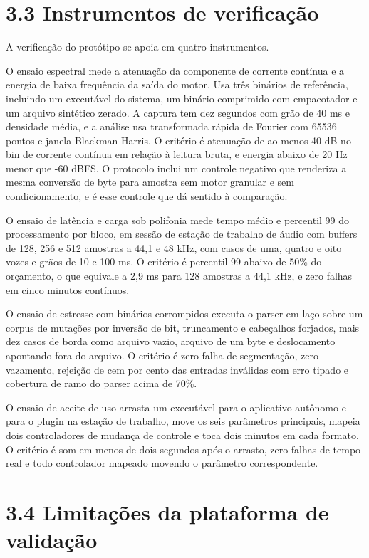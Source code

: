 \documentclass[12pt,a4paper]{article}
\begin{document}
\section*{3.3 Instrumentos de verificação}

A verificação do protótipo se apoia em quatro instrumentos.


O ensaio espectral mede a atenuação da componente de corrente contínua e a energia de baixa frequência da saída do motor. Usa três binários de referência, incluindo um executável do sistema, um binário comprimido com empacotador e um arquivo sintético zerado. A captura tem dez segundos com grão de 40 ms e densidade média, e a análise usa transformada rápida de Fourier com 65536 pontos e janela Blackman-Harris. O critério é atenuação de ao menos 40 dB no bin de corrente contínua em relação à leitura bruta, e energia abaixo de 20 Hz menor que -60 dBFS. O protocolo inclui um controle negativo que renderiza a mesma conversão de byte para amostra sem motor granular e sem condicionamento, e é esse controle que dá sentido à comparação.


O ensaio de latência e carga sob polifonia mede tempo médio e percentil 99 do processamento por bloco, em sessão de estação de trabalho de áudio com buffers de 128, 256 e 512 amostras a 44,1 e 48 kHz, com casos de uma, quatro e oito vozes e grãos de 10 e 100 ms. O critério é percentil 99 abaixo de 50\% do orçamento, o que equivale a 2,9 ms para 128 amostras a 44,1 kHz, e zero falhas em cinco minutos contínuos.


O ensaio de estresse com binários corrompidos executa o parser em laço sobre um corpus de mutações por inversão de bit, truncamento e cabeçalhos forjados, mais dez casos de borda como arquivo vazio, arquivo de um byte e deslocamento apontando fora do arquivo. O critério é zero falha de segmentação, zero vazamento, rejeição de cem por cento das entradas inválidas com erro tipado e cobertura de ramo do parser acima de 70\%.


O ensaio de aceite de uso arrasta um executável para o aplicativo autônomo e para o plugin na estação de trabalho, move os seis parâmetros principais, mapeia dois controladores de mudança de controle e toca dois minutos em cada formato. O critério é som em menos de dois segundos após o arrasto, zero falhas de tempo real e todo controlador mapeado movendo o parâmetro correspondente.


\section*{3.4 Limitações da plataforma de validação}
\end{document}
